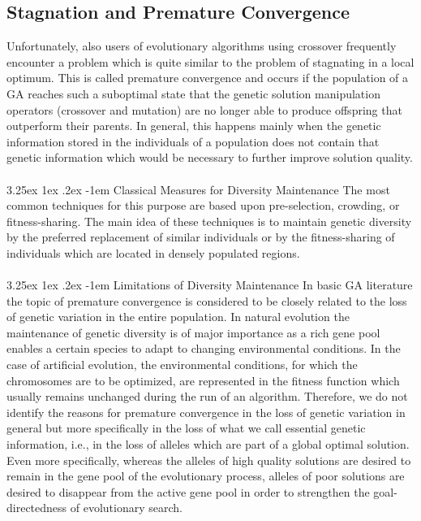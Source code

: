 \documentclass[12pt]{article}
\makeatletter
\renewcommand\paragraph{\@startsection{paragraph}{5}{\z@}%
  {3.25ex \@plus1ex \@minus.2ex}%
  {-1em}%
  {\normalfont\normalsize\bfseries}}
\makeatother
\begin{document}
\subsection{Stagnation and Premature Convergence}
Unfortunately, also users of evolutionary algorithms using crossover frequently encounter a problem which is quite similar to the problem of stagnating in a local optimum. This is called premature convergence and occurs if the population of a GA reaches such a suboptimal state that the genetic solution manipulation operators (crossover and mutation) are no longer able to produce offspring that outperform their parents. In general, this happens mainly when the genetic information stored in the individuals of a population does not contain that genetic information which would be necessary to further improve solution quality.\\\\
\paragraph{Classical Measures for Diversity Maintenance}
The most common techniques for this purpose are based upon pre-selection, crowding, or fitness-sharing. The main idea of these techniques is to maintain genetic diversity by the preferred replacement of similar individuals or by the fitness-sharing of individuals which are located in densely populated regions.\\\\
\paragraph{Limitations of Diversity Maintenance}
In basic GA literature the topic of premature convergence is considered to be closely related to the loss of genetic variation in the entire population. In natural evolution the maintenance of genetic diversity is of major importance as a rich gene pool enables a certain species to adapt to changing environmental conditions. In the case of artificial evolution, the environmental conditions, for which the chromosomes are to be optimized, are represented in the fitness function which usually remains unchanged during the run of an algorithm. Therefore, we do not identify the reasons for premature convergence in the loss of genetic variation in general but more specifically in the loss of what we call essential genetic information, i.e., in the loss of alleles which are part of a global optimal solution. Even more specifically, whereas the alleles of high quality solutions are desired to remain in the gene pool of the evolutionary process, alleles of poor solutions are desired to disappear from the active gene pool in order to strengthen the goal-directedness of evolutionary search.
\end{document}
